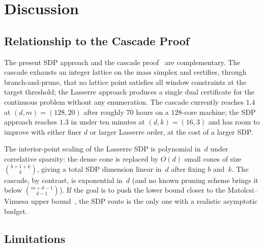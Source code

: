 \documentclass[11pt, letterpaper]{article}
\theoremstyle{paperplain}
\theoremstyle{paperdef}
\begin{document}
\section{Discussion}\label{sec:discussion}

\subsection{Relationship to the Cascade Proof}

The present SDP approach and the cascade proof~\cite{BajajCS2026} are
complementary.  The cascade exhausts an integer lattice on the mass
simplex and certifies, through branch-and-prune, that no lattice point
satisfies all window constraints at the target threshold; the
Lasserre approach produces a single dual certificate for the
continuous problem without any enumeration.  The cascade currently
reaches $1.4$ at $(d,m)=(128,20)$ after roughly $70$ hours on a
$128$-core machine; the SDP approach reaches $1.3$ in under ten
minutes at $(d,k)=(16,3)$ and has room to improve with either finer
$d$ or larger Lasserre order, at the cost of a larger SDP.

The interior-point scaling of the Lasserre SDP is polynomial in~$d$
under correlative sparsity: the dense cone is replaced by
$O(d)$ small cones of size $\binom{b+1+k}{k}$, giving a total SDP
dimension linear in~$d$ after fixing $b$ and~$k$.  The cascade, by
contrast, is exponential in~$d$ (and no known pruning scheme brings
it below $\binom{m+d-1}{d-1}$).  If the goal is to push the lower
bound closer to the Matolcsi--Vinuesa upper bound~\cite{MV10}, the
SDP route is the only one with a realistic asymptotic budget.

\subsection{Limitations}
\end{document}
